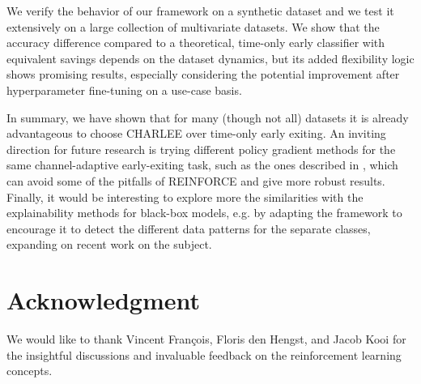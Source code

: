 \documentclass[conference]{IEEEtran}
\begin{document}
We verify the behavior of our framework on a synthetic dataset and we test it extensively on a large collection of multivariate datasets. We show that the accuracy difference compared to a theoretical, time-only early classifier with equivalent savings depends on the dataset dynamics, but its added flexibility logic shows promising results, especially considering the potential improvement after hyperparameter fine-tuning on a use-case basis. 

In summary, we have shown that for many (though not all) datasets it is already advantageous to choose CHARLEE over time-only early exiting. An inviting direction for future research is trying different policy gradient methods for the same channel-adaptive early-exiting task, such as the ones described in \cite{duan2016benchmarking}, which can avoid some of the pitfalls of REINFORCE and give more robust results.
Finally, it would be interesting to explore more the similarities with the explainability methods for black-box models, e.g. by adapting the framework to encourage it to detect the different data patterns for the separate classes, expanding on recent work on the subject\cite{gao2022rlpattern}.

\section*{Acknowledgment}

We would like to thank Vincent François, Floris den Hengst, and Jacob Kooi for the insightful discussions and invaluable feedback on the reinforcement learning concepts.




\end{document}

